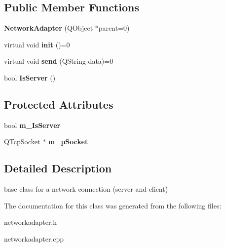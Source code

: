 \subsection*{\-Public \-Member \-Functions}
\begin{DoxyCompactItemize}
\item 
\hypertarget{classNetworkAdapter_a06f7164599740e840ef4663558019319}{{\bfseries \-Network\-Adapter} (\-Q\-Object $\ast$parent=0)}\label{classNetworkAdapter_a06f7164599740e840ef4663558019319}

\item 
\hypertarget{classNetworkAdapter_a5bfaa6d0344e0026418c99a27548a332}{virtual void {\bfseries init} ()=0}\label{classNetworkAdapter_a5bfaa6d0344e0026418c99a27548a332}

\item 
\hypertarget{classNetworkAdapter_a304921c7d4e599031608a9a9217c900f}{virtual void {\bfseries send} (\-Q\-String data)=0}\label{classNetworkAdapter_a304921c7d4e599031608a9a9217c900f}

\item 
\hypertarget{classNetworkAdapter_a37549ba9c99061a8c5407299b380139d}{bool {\bfseries \-Is\-Server} ()}\label{classNetworkAdapter_a37549ba9c99061a8c5407299b380139d}

\end{DoxyCompactItemize}
\subsection*{\-Protected \-Attributes}
\begin{DoxyCompactItemize}
\item 
\hypertarget{classNetworkAdapter_a8517d41d27fad01cd65a6342b562f7e0}{bool {\bfseries m\-\_\-\-Is\-Server}}\label{classNetworkAdapter_a8517d41d27fad01cd65a6342b562f7e0}

\item 
\hypertarget{classNetworkAdapter_a805305b01405a2890d9bbb784d44bde1}{\-Q\-Tcp\-Socket $\ast$ {\bfseries m\-\_\-p\-Socket}}\label{classNetworkAdapter_a805305b01405a2890d9bbb784d44bde1}

\end{DoxyCompactItemize}


\subsection{\-Detailed \-Description}
base class for a network connection (server and client) 

\-The documentation for this class was generated from the following files\-:\begin{DoxyCompactItemize}
\item 
networkadapter.\-h\item 
networkadapter.\-cpp\end{DoxyCompactItemize}
